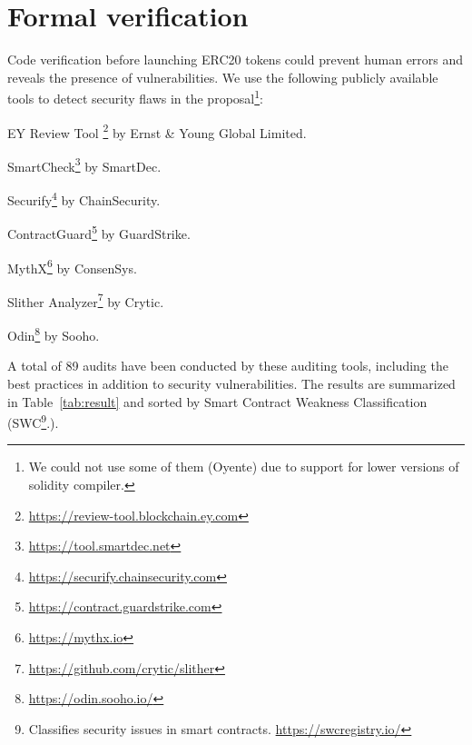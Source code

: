 
\section{Formal verification}\label{section:ver}
Code verification before launching ERC20 tokens could prevent human errors and reveals the presence of vulnerabilities. We use the following publicly available tools \cite{AuditTools} to detect security flaws in the proposal\footnote{We could not use some of them (\eg Oyente) due to support for lower versions of solidity compiler.}:
\begin{enumerate}[leftmargin=*,label={[\arabic*]}]
	\item EY Review Tool \footnote{\url{https://review-tool.blockchain.ey.com}} by Ernst \& Young Global Limited.
	\item SmartCheck\footnote{\url{https://tool.smartdec.net}} by SmartDec.
	\item Securify\footnote{\url{https://securify.chainsecurity.com}} by ChainSecurity.
	\item ContractGuard\footnote{\url{https://contract.guardstrike.com}} by GuardStrike.
	\item MythX\footnote{\url{https://mythx.io}} by ConsenSys.
	\item Slither Analyzer\footnote{\url{https://github.com/crytic/slither}} by Crytic.
	\item Odin\footnote{\url{https://odin.sooho.io/}} by Sooho.
\end{enumerate}

\noindent A total of 89 audits have been conducted by these auditing tools, including the best practices in addition to security vulnerabilities. The results are summarized in Table~\ref{tab:result} and sorted by Smart Contract Weakness Classification (SWC\footnote{Classifies security issues in smart contracts. \url{https://swcregistry.io/}}.).

